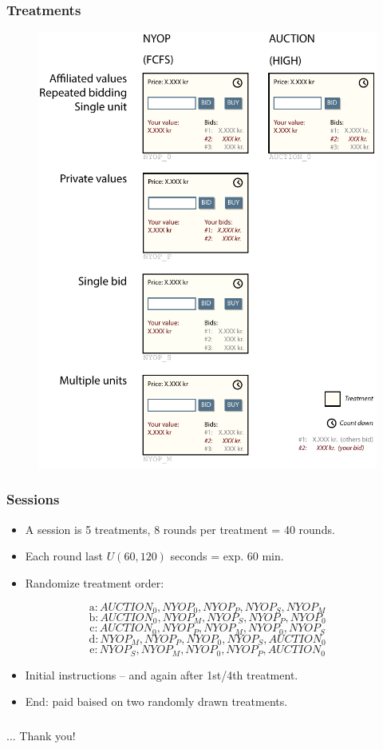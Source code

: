 \documentclass[mathserif,serif]{beamer}
\begin{document}
	\begin{frame}
		\frametitle{Treatments}
		\vspace*{-9mm}
		\begin{figure}[plain]
			\hspace*{25mm}
			\includegraphics[height=0.98\paperheight]{Figures/Treatments}
		\end{figure}
	\end{frame}

	\begin{frame}
		\frametitle{Sessions}
			\begin{itemize}
				\item A session is 5 treatments, 8 rounds per treatment = 40 rounds.
				\item Each round last $U(60, 120)$ seconds = exp. 60 min.
				\item Randomize treatment order:
			\end{itemize}
			\[	\mbox{a}: {AUCTION_0, NYOP_0, NYOP_P, NYOP_S, NYOP_M} \]
			\[	\mbox{b}: {AUCTION_0, NYOP_M, NYOP_S, NYOP_P, NYOP_0} \]
			\[	\mbox{c}: {AUCTION_0, NYOP_P, NYOP_M, NYOP_0, NYOP_S} \]
			\[	\mbox{d}: {NYOP_M, NYOP_P, NYOP_0, NYOP_S, AUCTION_0} \]
			\[	\mbox{e}: {NYOP_S, NYOP_M, NYOP_0, NYOP_P, AUCTION_0} \]
			\begin{itemize}
				\item Initial instructions -- and again after 1st/4th treatment.
				\item End: paid baised on two randomly drawn treatments.
			\end{itemize}
	\end{frame}
	
	
	\begin{frame}
		\frametitle{}
		\vspace{2\baselineskip}
		... Thank you!
	\end{frame}
\end{document}
